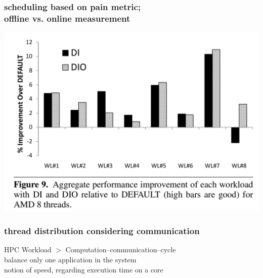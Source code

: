 \documentclass[utf8,10pt]{beamer}
\begin{document}
\begin{frame}
  \frametitle{scheduling based on pain metric;\\ offline vs. online measurement
    }
  \centering
  \includegraphics[height=0.7\textheight, keepaspectratio]{./opteron_di_dio}
\end{frame}


\begin{frame}
  \frametitle{thread distribution considering
    communication}
  HPC Workload $>$ Computation--communication--cycle \\
  balance only one application in the system \\
  notion of speed, regarding execution time on a core
\end{frame}
\end{document}

